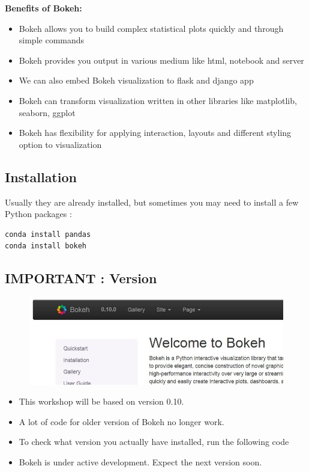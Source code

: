 \documentclass[12pt, a4paper]{report}
\begin{document}
\newpage
\begin{framed}
	\noindent \textbf{Benefits of Bokeh:}
	
	\begin{itemize}
		\item Bokeh allows you to build complex statistical plots quickly and through simple commands
		\item Bokeh provides you output in various medium like html, notebook and server
		\item We can also embed Bokeh visualization to flask and django app
		\item Bokeh can transform visualization written in other libraries like matplotlib, seaborn, ggplot
		\item Bokeh has flexibility for applying interaction, layouts and different styling option to visualization
	\end{itemize}
\end{framed}
\newpage
\subsection*{Installation}
Usually they are already installed, but sometimes you may need to install a few Python packages :


\begin{framed}
\begin{verbatim}
conda install pandas
conda install bokeh
\end{verbatim}
\end{framed}

\subsection*{IMPORTANT : Version}

\begin{figure}[h!]
\centering
\includegraphics[width=0.7\linewidth]{images/00-BOKEH-version}
\end{figure}
{
	\Large
\begin{itemize}
\item This workshop will be based on version 0.10. 
\item A lot of code for older version of Bokeh no longer work.
\item To check what version you actually have installed, run the following code
\item Bokeh is under active development. Expect the next version soon.
\end{itemize}
}
\end{document}
